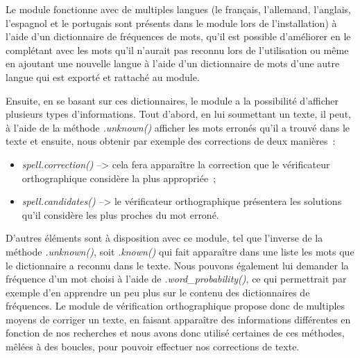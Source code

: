 Le module fonctionne avec de multiples langues (le français, l'allemand, l'anglais, l'espagnol et le portugais sont présents dans le module lors de l'installation) à l'aide d'un dictionnaire de fréquences de mots, qu'il est possible d'améliorer en le complétant avec les mots qu'il n'aurait pas reconnu lors de l'utilisation ou même en ajoutant une nouvelle langue à l'aide d'un dictionnaire de mots d'une autre langue qui est exporté et rattaché au module.

Ensuite, en se basant sur ces dictionnaires, le module a la possibilité d'afficher plusieurs types d'informations. Tout d'abord, en lui soumettant un texte, il peut, à l'aide de la méthode \emph{.unknown()} afficher les mots erronés qu'il a trouvé dans le texte et ensuite, nous obtenir par exemple des corrections de deux manières~:
\begin{itemize}
    \item \emph{spell.correction()} --> cela fera apparaître la correction que le vérificateur orthographique considère la plus appropriée~;
    \item \emph{spell.candidates()} --> le vérificateur orthographique présentera les solutions qu'il considère les plus proches du mot erroné.
\end{itemize}
D'autres éléments sont à disposition avec ce module, tel que l'inverse de la méthode \emph{.unknown()}, soit \emph{.known()} qui fait apparaître dans une liste les mots que le dictionnaire a reconnu dans le texte. Nous pouvons également lui demander la fréquence d'un mot choisi à l'aide de \emph{.word\_probability()}, ce qui permettrait par exemple d'en apprendre un peu plus sur le contenu des dictionnaires de fréquences.
Le module de vérification orthographique propose donc de multiples moyens de corriger un texte, en faisant apparaître des informations différentes en fonction de nos recherches et nous avons donc utilisé certaines de ces méthodes, mêlées à des boucles, pour pouvoir effectuer nos corrections de texte.

